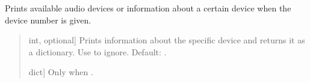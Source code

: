 \documentclass[letterpaper,10pt,english]{sphinxmanual}
\begin{document}
\begin{fulllineitems}
\label{\detokenize{modules/dsptools.measure:dsptools.measure.print_device_info}}
\pysigstartsignatures
{}
\pysigstopsignatures
\sphinxAtStartPar
Prints available audio devices or information about a certain device
when the device number is given.
\begin{quote}\begin{description}
\begin{description}
\sphinxlineitem{\sphinxstylestrong{device\_number}}{[}int, optional{]}
\sphinxAtStartPar
Prints information about the specific device and returns it as
a dictionary. Use  to ignore. Default: .

\end{description}

\begin{description}
\sphinxlineitem{\sphinxstylestrong{d}}{[}dict{]}
\sphinxAtStartPar
Only when .

\end{description}

\end{description}\end{quote}

\end{fulllineitems}

\end{document}
